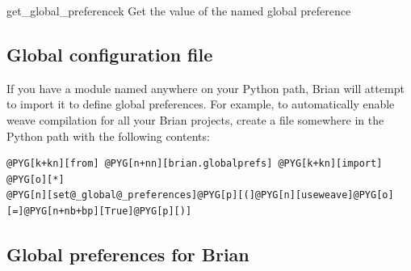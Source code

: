 \documentclass[letterpaper,10pt,english]{manual}
\begin{document}
\hypertarget{brian.get_global_preference}{}\begin{funcdesc}{get\_global\_preference}{k}
Get the value of the named global preference
\end{funcdesc}


\subsection{Global configuration file}

If you have a module named  anywhere on your Python path,
Brian will attempt to import it to define global preferences. For example, to
automatically enable weave compilation for all your Brian projects, create a
file  somewhere in the Python path with the following
contents:

\begin{Verbatim}[commandchars=@\[\]]
@PYG[k+kn][from] @PYG[n+nn][brian.globalprefs] @PYG[k+kn][import] @PYG[o][*]
@PYG[n][set@_global@_preferences]@PYG[p][(]@PYG[n][useweave]@PYG[o][=]@PYG[n+nb+bp][True]@PYG[p][)]
\end{Verbatim}


\subsection{Global preferences for Brian}
\end{document}
